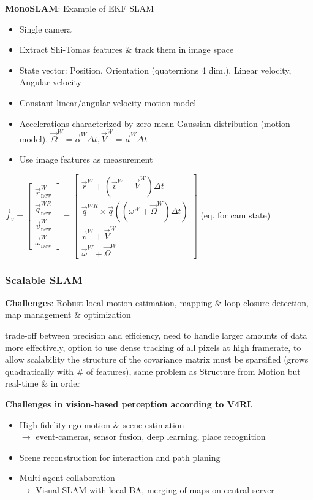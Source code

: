 \documentclass[fontsize=6pt]{scrartcl}
\begin{document}
\begin{multicols*}{4}
\textbf{MonoSLAM}: Example of EKF SLAM

\begin{itemize}
	\item Single camera
	\item Extract Shi-Tomas features \& track them in image space
	\item State vector: Position, Orientation (quaternions 4 dim.), Linear velocity, Angular velocity
	\item Constant linear/angular velocity motion model
	\item Accelerations characterized by zero-mean Gaussian distribution (motion model), $\vec \Omega^W = \vec{\alpha}^W\Delta t, \vec V^W = \vec{a}^W\Delta t$
	\item Use image features as measurement
\end{itemize}

{\centering
	$
	\vec f_v
	=
	\left[
	\begin{matrix}
	\vec r_\mathrm{new}^W \\
	\vec q_\mathrm{new}^{WR} \\
	\vec v_\mathrm{new}^W \\
	\vec \omega_\mathrm{new}^W
	\end{matrix}
	\right]
	=
	\left[
	\begin{matrix}
	\vec r^W
	+ (\vec v^W + \vec V^W)\Delta t \\
	\vec q^{WR}
	\times \vec q((\omega^W+\vec\Omega^W)\Delta t)\\
	\vec v^W + \vec V^W\\
	\vec \omega^W + \vec \Omega^W
	\end{matrix}
	\right]
	$ (eq. for cam state)
\par}

\subsubsection*{Scalable SLAM}
\textbf{Challenges}: Robust local motion estimation, mapping \& loop closure detection, map management \& optimization

trade-off between precision and efficiency, need to handle larger amounts of data more effectively,	option to use dense tracking of all pixels at high framerate, to allow scalability the structure of the covariance matrix must be sparsified (grows quadratically with \# of features), same problem as Structure from Motion but real-time \& in order

\textbf{Challenges in vision-based perception according to V4RL}
\begin{itemize}
	\item High fidelity ego-motion \& scene estimation \\
	$\rightarrow$ event-cameras, sensor fusion, deep learning, place recognition
	\item Scene reconstruction for interaction and path planing
	\item Multi-agent collaboration\\
	$\rightarrow$ Visual SLAM with local BA, merging of maps on central server
\end{itemize}


\end{multicols*}
\end{document}

